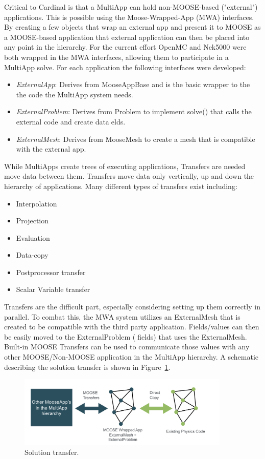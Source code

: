 Critical to Cardinal is that a MultiApp can hold non-MOOSE-based ("external") applications. This is possible using the Moose-Wrapped-App (MWA) interfaces. By creating a few objects that wrap an external app and present it to MOOSE as a MOOSE-based application that external application can then be placed into any point in the hierarchy. For the current effort OpenMC and Nek5000 were both wrapped in the MWA interfaces, allowing them to participate in a MultiApp solve. For each application the following interfaces were developed:
\begin{itemize}
    \item \textit{ExternalApp}: Derives from MooseAppBase and is the basic wrapper to the the code the MultiApp
    system needs.
    \item \textit{ExternalProblem}: Derives from Problem to implement solve() that calls the external code and create
    dataelds.
    \item \textit{ExternalMesh}: Derives from MooseMesh to create a mesh that is compatible with the external app.
\end{itemize}
While MultiApps create trees of executing applications, Transfers are needed move data between them. Transfers move data only vertically, up and down the hierarchy of applications. Many different types of transfers exist including:
\begin{itemize}
  \item Interpolation
  \item Projection
  \item Evaluation
  \item Data-copy
  \item Postprocessor transfer
  \item Scalar Variable transfer
\end{itemize}
Transfers are the difficult part, especially considering setting up them correctly in parallel. To combat this, the MWA system utilizes an ExternalMesh that is created to be compatible with the third party application. Fields/values can then be easily moved to the ExternalProblem (fields) that uses the ExternalMesh. Built-in MOOSE Transfers can be used to communicate those values with any other MOOSE/Non-MOOSE application in the MultiApp hierarchy. A schematic describing the solution transfer is shown in Figure~\ref{f:moose2}.

\begin{figure}[!h]
\centering
\includegraphics[clip=true,width=0.9\textwidth]{Figures/moose2}
\caption{Solution transfer.}
\label{f:moose2}
\end{figure}

